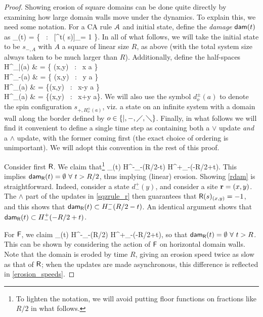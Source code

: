 \documentclass[pra,aps,twocolumn,groupedaddress,superscriptaddress,nofootinbib,preprintnumbers]{revtex4-2}
\begin{document}
\begin{widetext}
\begin{proof}
			Showing erosion of square domains can be done quite directly by examining how large domain walls move under the dynamics. To explain this, we need some notation. For a CA rule $\mathcal{A}$ and initial state, define the {\it damage} ${\sf dam}(t)$ as 
			\be \dam_\mca(t) = \{ \bfr \, : \, [\mca^t( s)]_\bfr = 1 \}.\ee
			In all of what follows, we will take the initial state to be $s_{-,A}$ with $A$ a square of linear size $R$, as above (with the total system size always taken to be much larger than $R$). 
			Additionally, define the half-spaces 
			\bea H^\pm_|(a) & = \{ (x,y) \, : \, x \gtrless a \} \\
			H^\pm_-(a) & = \{ (x,y) \, : \, y \gtrless a \} \\ 
			H^\pm_\diagup(a) & = \{(x,y) \, : \, x-y \gtrless a \} \\ 
			H^\pm_\diagdown (a) & = \{(x,y) \, : \, x+y \gtrless a\}.\eea 
			We will also use the symbol $d^\pm_o(a)$ to denote the spin configuration  $s_{+,H^\pm_o(a)}$, viz. a state on an infinite system with a domain wall along the border defined by $o \in \{|,-,\diagup,\diagdown\}$. 
			Finally, in what follows we will find it convenient to define a single time step as containing both a $\vee$ update {\it and} a $\wedge$ update, with the former coming first (the exact choice of ordering is unimportant). We will adopt this convention in the rest of this proof. 
			
			Consider first $\mathsf{R}$. We claim that\footnote{To lighten the notation, we will avoid putting floor functions on fractions like $R/2$ in what follows.}
			\be \label{rdam} \dam_\sfR(t) \subset H^-_-(R/2-t) \cap H^+_-(-R/2+t). \ee 
			This implies ${\sf dam}_{\mathsf{R}}(t) = \emptyset \,\, \forall \,\, t > R/2$, thus implying (linear) erosion. Showing \eqref{rdam} is straightforward. Indeed, consider a state $d^+_-(y)$, and consider a site $\mathbf{r}=(x,y)$. The $\wedge$ part of the updates in \eqref{sqzrule_r} then guarantees that $\mathsf{R}(s)_{(x,y)} = -1$, and this shows that ${\sf dam}_{\mathsf{R}}(t) \subset H^-_-(R/2-t)$. An identical argument shows that ${\sf dam}_{\mathsf{R}}(t) \subset H^+_-(-R/2+t)$. 
			
			For $\mathsf{F}$, we claim 
			\be \dam_\sfF(t) \subset  H^-_-(R/2) \cap H^+_-(-R/2+t), \ee
			so that ${\sf dam}_{\mathsf{R}}(t) = \emptyset \,\, \forall \,\, t > R$. This can be shown by considering the action of $\mathsf{F}$ on horizontal domain walls. Note that the domain is eroded by time $R$, giving an erosion speed twice as slow as that of $\mathsf{R}$; when the updates are made asynchronous, this difference is reflected in \eqref{erosion_speeds}. 
			

\end{proof}
\end{widetext}
\end{document}
